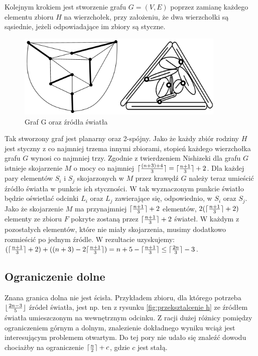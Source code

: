 \documentclass[brudnopis]{xmgr}
\DeclarePairedDelimiter\ceil{\lceil}{\rceil}
\DeclarePairedDelimiter\floor{\lfloor}{\rfloor}
\theoremstyle{definition}
\begin{document}
\indent Kolejnym krokiem jest stworzenie grafu $G=(V,E)$ poprzez zamianę każdego elementu zbioru $H$ na wierzchołek, przy założeniu, że dwa wierzchołki są sąsiednie, jeżeli odpowiadające im zbiory są styczne.
\begin{figure}[ht!]
 \centering
  \includegraphics[height=4cm]{rysunki/skojarzenia_zrodla_swiatla.png}
  \caption{Graf G oraz źródła światła}
\end{figure}
Tak stworzony graf jest planarny oraz 2-spójny. Jako że każdy zbiór rodziny $H$ jest styczny z co najmniej trzema innymi zbiorami, stopień każdego wierzchołka grafu $G$ wynosi co najmniej trzy. Zgodnie z twierdzeniem Nishizeki \cite{nishizeki} dla grafu $G$ istnieje skojarzenie $M$ o mocy co najmniej $\ceil{\frac{(n+3)+4}{3}} = \ceil{\frac{n+1}{3}}  + 2$. Dla każdej pary elementów $S_i$ i $S_j$ skojarzonych w $M$ przez krawędź $G$ należy teraz umieścić źródło światła w punkcie ich styczności. W tak wyznaczonym punkcie światło będzie oświetlać odcinki $L_i$ oraz $L_j$ zawierające się, odpowiednio, w $S_i$ oraz $S_j$. Jako że skojarzenie $M$ ma przynajmniej $\ceil{\frac{n+1}{3}} + 2$ elementów, $2(\ceil{\frac{n+1}{3}} + 2)$ elementy ze zbioru $F$ pokryte zostaną przez $\ceil{\frac{n+1}{3}} + 2$ świateł. W każdym z pozostałych elementów, które nie miały skojarzenia, musimy dodatkowo rozmieścić po jednym źródle. W rezultacie uzyskujemy:
$(\ceil{\frac{n+1}{3}} + 2) + ((n + 3) - 2\ceil{\frac{n+1}{3}}) = n + 5 - \ceil{\frac{n+1}{3}} \le \ceil{\frac{2n}{3}} - 3$.

\subsection{Ograniczenie dolne}
\indent Znana granica dolna nie jest ścisła. Przykładem zbioru, dla którego potrzeba $\floor{\frac{2n-3}{5}}$ źródeł światła, jest np. ten z rysunku \ref{fig:przeksztalcenie h} ze źródłem światła umieszczonym na wewnętrznym odcinku. Z racji dużej różnicy pomiędzy ograniczeniem górnym a dolnym, znalezienie dokładnego wyniku wciąż jest interesującym problemem otwartym. Do tej pory nie udało się znaleźć dowodu chociażby na ograniczenie $\ceil{\frac{n}{2}} + c$, gdzie $c$ jest stałą.
\end{document}
